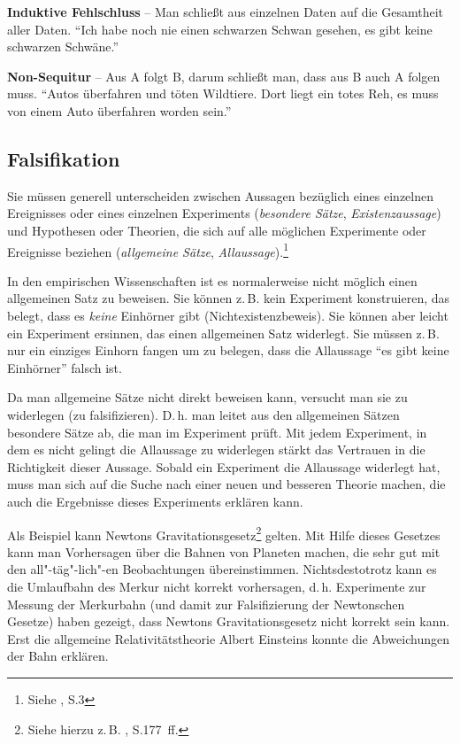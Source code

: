 \documentclass[a4paper,11pt,headings=normal]{scrartcl}
\begin{document}
\vspace{0.3cm}\noindent\textbf{Induktive Fehlschluss} -- Man schließt aus einzelnen Daten auf die Gesamtheit aller Daten. "`Ich habe noch nie einen schwarzen Schwan gesehen, es gibt keine schwarzen Schwäne."'

\vspace{0.3cm}\noindent\textbf{Non-Sequitur} -- Aus A folgt B, darum schließt man, dass aus B auch A folgen muss. "`Autos überfahren und töten Wildtiere. Dort liegt ein totes Reh, es muss von einem Auto überfahren worden sein."'


\subsection{Falsifikation}

Sie müssen generell unterscheiden zwischen Aussagen bezüglich eines einzelnen Ereignisses oder eines einzelnen Experiments (\textit{besondere Sätze}, \textit{Existenzaussage}) und Hypothesen oder Theorien, die sich auf alle möglichen Experimente oder Ereignisse beziehen (\textit{allgemeine Sätze}, \textit{Allaussage}).\footnote{Siehe \autocite{Popper1969}, S.3}

In den empirischen Wissenschaften ist es normalerweise nicht möglich einen allgemeinen Satz zu beweisen. Sie können z.\,B. kein Experiment konstruieren, das belegt, dass es \textit{keine} Einhörner gibt (Nichtexistenzbeweis). Sie können aber leicht ein Experiment ersinnen, das einen allgemeinen Satz widerlegt. Sie müssen z.\,B. nur ein einziges Einhorn fangen um zu belegen, dass die Allaussage "`es gibt keine Einhörner"' falsch ist.

Da man allgemeine Sätze nicht direkt beweisen kann, versucht man sie zu widerlegen (zu falsifizieren). D.\,h. man leitet aus den allgemeinen Sätzen besondere Sätze ab, die man im Experiment prüft. Mit jedem Experiment, in dem es  nicht gelingt die Allaussage zu widerlegen stärkt das Vertrauen in die Richtigkeit dieser Aussage. Sobald ein Experiment die Allaussage widerlegt hat, muss man sich auf die Suche nach einer neuen und besseren Theorie machen, die auch die Ergebnisse dieses Experiments erklären kann.

Als Beispiel kann Newtons Gravitationsgesetz\footnote{Siehe hierzu z.\,B. \autocite{Giancoli2010}, S.177~ff.} gelten. Mit Hilfe dieses Gesetzes kann man Vorhersagen über die Bahnen von Planeten machen, die sehr gut mit den all"-täg"-lich"-en Beobachtungen übereinstimmen. Nichtsdestotrotz kann es die Umlaufbahn des Merkur nicht korrekt vorhersagen, d.\,h. Experimente zur Messung der Merkurbahn (und damit zur Falsifizierung der Newtonschen Gesetze) haben gezeigt, dass Newtons Gravitationsgesetz nicht korrekt sein kann. Erst die allgemeine Relativitätstheorie Albert Einsteins konnte die Abweichungen der Bahn erklären.
\end{document}
